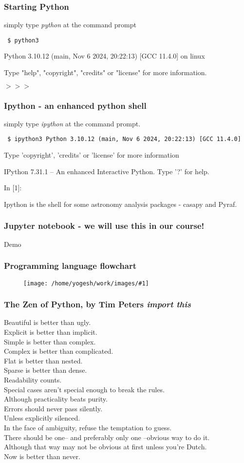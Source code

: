 \documentclass{beamer}
\newcommand{\bfr}{\begin{frame}}
\newcommand{\ft}[1]{\frametitle{#1}}
\newcommand{\myfig}[1]{\begin{figure} \texttt{[image: /home/yogesh/work/images/\#1]} \end{figure}}
\begin{document}
\bfr
\ft{Starting Python}

simply type {\it python} at the command prompt

{\tt
  \$ python3

Python 3.10.12 (main, Nov  6 2024, 20:22:13) [GCC 11.4.0] on linux
  
Type "help", "copyright", "credits" or "license" for more information.
  
$>>> $
  
}
\end{frame}

\bfr
\ft{Ipython - an enhanced python shell}
simply type {\it ipython} at the command prompt.

\bigskip

{\tt
  \$ ipython3
Python 3.10.12 (main, Nov  6 2024, 20:22:13) [GCC 11.4.0]

Type 'copyright', 'credits' or 'license' for more information

IPython 7.31.1 -- An enhanced Interactive Python. Type '?' for help.

In [1]: 
}


Ipython is the shell for some astronomy analysis packages - casapy and Pyraf.

\end{frame}

\bfr
\ft{Jupyter notebook - we will use this in our course!}
\alert{Demo}
\end{frame}

\bfr
\ft{Programming language flowchart}
\myfig{proglanguageflowchart.png}
\end{frame}

\bfr
\ft{The Zen of Python, by Tim Peters {\it import this}}
Beautiful is better than ugly.\\
Explicit is better than implicit.\\
Simple is better than complex.\\
Complex is better than complicated.\\
Flat is better than nested.\\
Sparse is better than dense.\\
Readability counts.\\
Special cases aren't special enough to break the rules.\\
Although practicality beats purity.\\
Errors should never pass silently.\\
Unless explicitly silenced.\\
In the face of ambiguity, refuse the temptation to guess.\\
There should be one-- and preferably only one --obvious way to do it.\\
Although that way may not be obvious at first unless you're Dutch.\\
Now is better than never.\\
\end{frame}
\end{document}
